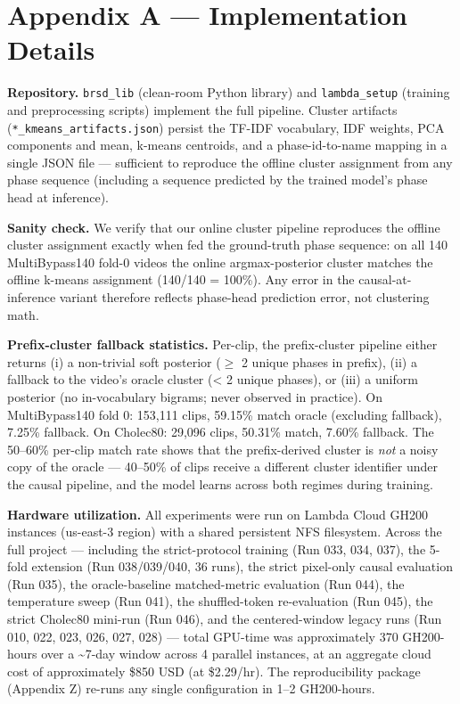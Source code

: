 \section{Appendix A --- Implementation
Details}\label{appendix-a-implementation-details}

\textbf{Repository.} \texttt{brsd\_lib} (clean-room Python library) and
\texttt{lambda\_setup} (training and preprocessing scripts) implement
the full pipeline. Cluster artifacts
(\texttt{*\_kmeans\_artifacts.json}) persist the TF-IDF vocabulary, IDF
weights, PCA components and mean, k-means centroids, and a
phase-id-to-name mapping in a single JSON file --- sufficient to
reproduce the offline cluster assignment from any phase sequence
(including a sequence predicted by the trained model's phase head at
inference).

\textbf{Sanity check.} We verify that our online cluster pipeline
reproduces the offline cluster assignment exactly when fed the
ground-truth phase sequence: on all 140 MultiBypass140 fold-0 videos the
online argmax-posterior cluster matches the offline k-means assignment
(140/140 = 100\%). Any error in the causal-at-inference variant
therefore reflects phase-head prediction error, not clustering math.

\textbf{Prefix-cluster fallback statistics.} Per-clip, the
prefix-cluster pipeline either returns (i) a non-trivial soft posterior
($\geq$ 2 unique phases in prefix), (ii) a fallback to the video's oracle
cluster (\textless{} 2 unique phases), or (iii) a uniform posterior (no
in-vocabulary bigrams; never observed in practice). On MultiBypass140
fold 0: 153,111 clips, 59.15\% match oracle (excluding fallback), 7.25\%
fallback. On Cholec80: 29,096 clips, 50.31\% match, 7.60\% fallback. The
50--60\% per-clip match rate shows that the prefix-derived cluster is
\emph{not} a noisy copy of the oracle --- 40--50\% of clips receive a
different cluster identifier under the causal pipeline, and the model
learns across both regimes during training.

\textbf{Hardware utilization.} All experiments were run on Lambda Cloud
GH200 instances (us-east-3 region) with a shared persistent NFS
filesystem. Across the full project --- including the strict-protocol
training (Run 033, 034, 037), the 5-fold extension (Run 038/039/040, 36
runs), the strict pixel-only causal evaluation (Run 035), the
oracle-baseline matched-metric evaluation (Run 044), the temperature
sweep (Run 041), the shuffled-token re-evaluation (Run 045), the strict
Cholec80 mini-run (Run 046), and the centered-window legacy runs (Run
010, 022, 023, 026, 027, 028) --- total GPU-time was approximately 370
GH200-hours over a \textasciitilde7-day window across 4 parallel
instances, at an aggregate cloud cost of approximately \$850 USD (at
\$2.29/hr). The reproducibility package (Appendix Z) re-runs any single
configuration in 1--2 GH200-hours.


